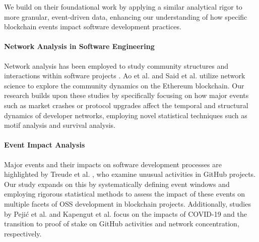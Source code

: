 We build on their foundational work by applying a similar analytical rigor to more granular, event-driven data, enhancing our understanding of how specific blockchain events impact software development practices.
\paragraph{Network Analysis in Software Engineering}
Network analysis has been employed to study community structures and interactions within software projects \cite{bartolucci2020butterfly, ferretti2020ethereum, kleinberg2000small, la2023game, louridas2008power, lucchini2020code, potanin2005scale, valverde2003hierarchical}.
Ao et al. \cite{Ao2021Temporal} and Said et al. \cite{Said2021Detailed} utilize network science to explore the community dynamics on the Ethereum blockchain. Our research builds upon these studies by specifically focusing on how major events such as market crashes or protocol upgrades affect the temporal and structural dynamics of developer networks, employing novel statistical techniques such as motif analysis and survival analysis.
\paragraph{Event Impact Analysis}
Major events and their impacts on software development processes are highlighted by Treude et al. \cite{Treude2017Unusual}, who examine unusual activities in GitHub projects. Our study expands on this by systematically defining event windows and employing rigorous statistical methods to assess the impact of these events on multiple facets of OSS development in blockchain projects. Additionally, studies by Pejić et al. \cite{Pejić2023Analyzing} and Kapengut et al. \cite{Kapengut2022An} focus on the impacts of COVID-19 and the transition to proof of stake on GitHub activities and network concentration, respectively. 


